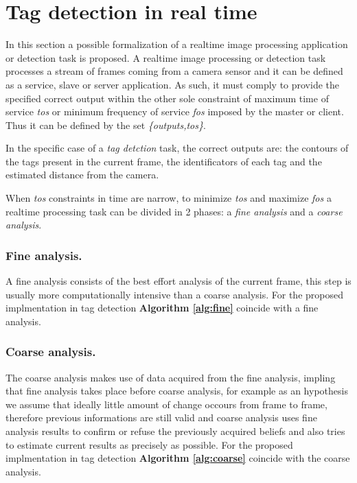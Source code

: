 \documentclass[a4paper]{report}
\begin{document}
\newpage 

\section{Tag detection in real time}

In this section a possible formalization of a realtime image processing application or detection task is proposed. 
A realtime image processing or detection task processes a stream of frames coming from a camera sensor and it can be defined as a service, slave or server application. As such, it must comply to provide the specified correct output within the other sole constraint of maximum time of service \textit{tos} or minimum frequency of service \textit{fos} imposed by the master or client. Thus it can be defined by the set \textit{\{outputs,tos\}}.

In the specific case of a \textit{tag detction} task, the correct outputs are: the contours of the tags present in the current frame, the identificators of each tag and the estimated distance from the camera.

When \textit{tos} constraints in time are narrow, to minimize \textit{tos} and maximize \textit{fos} a realtime processing task can be divided in 2 phases: a \textit{fine analysis} and a \textit{coarse analysis}.

\subsubsection{Fine analysis.}
A fine analysis consists of the best effort analysis of the current frame, this step is usually more computationally intensive than a coarse analysis.
For the proposed implmentation in tag detection \textbf{Algorithm \ref{alg:fine}} coincide with a fine analysis.

\subsubsection{Coarse analysis.}
The coarse analysis makes use of data acquired from the fine analysis, impling that fine analysis takes place before coarse analysis, for example as an hypothesis we assume that ideally little amount of change occours from frame to frame, therefore previous informations are still valid and coarse analysis uses fine analysis results to confirm or refuse the previously acquired beliefs and also tries to estimate current results as precisely as possible. For the proposed implmentation in tag detection \textbf{Algorithm \ref{alg:coarse}} coincide with the coarse analysis.\newline
\end{document}
